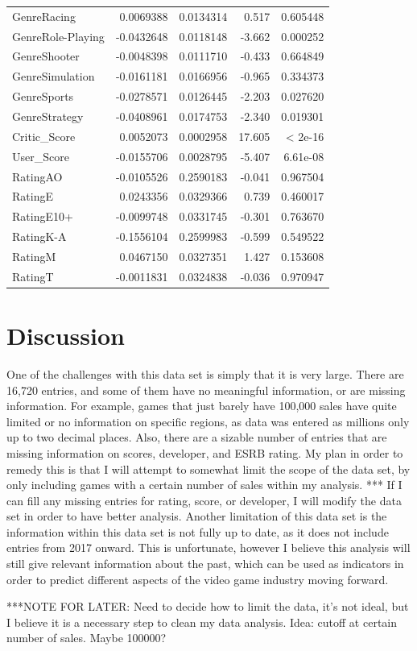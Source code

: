 \documentclass[12pt]{article}
\begin{document}
\begin{table}[ht]
\begin{tabular}{lrrrr}
$$GenreRacing & 0.0069388 & 0.0134314 & 0.517 & 0.605448  \\
GenreRole-Playing & -0.0432648 & 0.0118148 & -3.662 & 0.000252   \\
GenreShooter & -0.0048398 & 0.0111710 & -0.433 & 0.664849  \\
GenreSimulation & -0.0161181 & 0.0166956 & -0.965 & 0.334373  \\
GenreSports & -0.0278571 & 0.0126445 & -2.203 & 0.027620   \\
GenreStrategy & -0.0408961 & 0.0174753 & -2.340 & 0.019301   \\
Critic_Score & 0.0052073 & 0.0002958 & 17.605 & < 2e-16   \\
User_Score & -0.0155706 & 0.0028795 & -5.407 & 6.61e-08   \\
RatingAO & -0.0105526 & 0.2590183 & -0.041 & 0.967504  \\
RatingE & 0.0243356 & 0.0329366 & 0.739 & 0.460017  \\
RatingE10+ & -0.0099748 & 0.0331745 & -0.301 & 0.763670  \\
RatingK-A & -0.1556104 & 0.2599983 & -0.599 & 0.549522  \\
RatingM & 0.0467150 & 0.0327351 & 1.427 & 0.153608  \\
RatingT & -0.0011831 & 0.0324838 & -0.036 & 0.970947 \\
 \hline
\end{tabular}
\end{table}



\section{Discussion}
\label{sec:disc}

One of the challenges with this data set is simply that it is very large. There are 16,720 entries, and some of them have no meaningful 
information, or are missing information. For example, games that just barely have 100,000 sales have quite limited or no information on 
specific regions, as data was entered as millions only up to two decimal places. Also, there are a sizable number of entries that are 
missing information on scores, developer, and ESRB rating. My plan in order to remedy this is that I will attempt to somewhat limit the 
scope of the data set, by only including games with a certain number of sales within my analysis. ***
If I can fill any missing entries for rating, score, or developer, I will modify the data set in order to have better analysis. Another 
limitation of this data set is the information within this data set is not fully up to date, as it does not include entries from 2017 
onward. This is unfortunate, however I believe this analysis will still give relevant information about the past, which can be used as 
indicators in order to predict different aspects of the video game industry moving forward.

***NOTE FOR LATER: Need to decide how to limit the data, it's not ideal, but I believe it is a necessary step to clean my data analysis. Idea: cutoff at certain number of sales. Maybe 100000?


\end{document}
